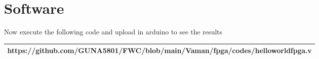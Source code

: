 \documentclass{article}
\begin{document}
\section{Software}
   Now execute the following code  and upload  in arduino to see the results \\
   \vspace{5mm}
   \begin{tabularx}{1.25\textwidth} { 
  | >{\centering\arraybackslash}X |}
  \hline
  https://github.com/GUNA5801/FWC/blob/main/Vaman/fpga/codes/helloworldfpga.v \\
  \hline
\end{tabularx}
\end{document}
